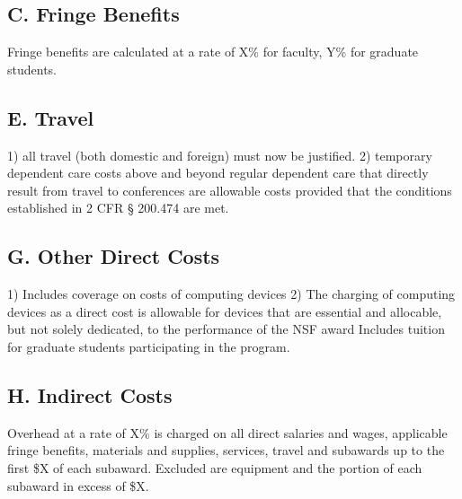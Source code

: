 \subsection*{C. Fringe Benefits}
Fringe benefits are calculated at a rate of X\% for faculty, Y\% for graduate students.
\subsection*{E. Travel}
1) all travel (both domestic and foreign) must now be justified.
2) temporary dependent care costs above and beyond regular dependent care that directly result from travel to conferences are allowable costs provided that the conditions established in 2 CFR § 200.474 are met.
\subsection*{G. Other Direct Costs}
1) Includes coverage on costs of computing devices
2) The charging of computing devices as a direct cost is allowable for devices that are essential and allocable, but not solely dedicated, to the performance of the NSF award
 Includes tuition for graduate students participating in the program.
\subsection*{H. Indirect Costs}
Overhead at a rate of X\% is charged on all direct salaries and wages, applicable fringe benefits, materials and supplies, services, travel and subawards up to the first \$X of each subaward. Excluded are equipment and the portion of each subaward in excess of \$X.
\fi
